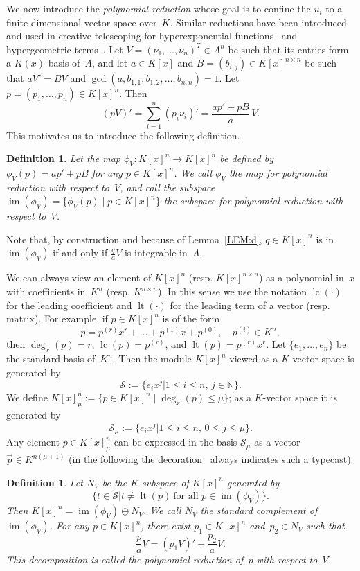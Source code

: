 \documentclass{sig-alternate}
\newtheorem{defi}[theorem]{Definition}
\newcommand{\bN}{ {\mathbb N}}
\newcommand{\cS}{ {\mathcal S}}
\def\lc{\operatorname{lc}}
\def\lt{\operatorname{lt}}
\def\im{\operatorname{im}}
\begin{document}
We now introduce the \emph{polynomial reduction} whose goal is to confine the $u_i$ to a finite-dimensional
vector space over~$K$. Similar reductions have been introduced and used in creative telescoping
for hyperexponential functions~\cite{bostan13a} and hypergeometric terms~\cite{chen15a}.
Let $V = (\nu_1, \ldots, \nu_n)^T\in A^n$ be such that its entries form a $K(x)$-basis of~$A$,
and let $a\in K[x]$ and $B = (b_{i, j})\in K[x]^{n \times n}$ be such that $aV'=BV$ and
$\gcd(a, b_{1, 1}, b_{1, 2}, \ldots, b_{n ,n})=1$. Let $p = (p_1, \ldots, p_n)\in K[x]^n$. Then
\begin{equation} \label{EQ:polyred}
  (pV)' = \sum_{i=1}^n (p_i \nu_i)' = \frac{ap' + pB}{a}\, V.
\end{equation}
This motivates us to introduce the following definition.
\begin{defi}
Let the map $\phi_V\colon K[x]^n \rightarrow K[x]^n$
be defined by $\phi_V(p) = ap' + pB$ for any $p\in K[x]^n$.
We call $\phi_V$ the \emph{map for polynomial reduction} with respect to~$V$, and call
the subspace $\im(\phi_V) = \{\phi_V(p) \mid p \in K[x]^n\}$
the \emph{subspace for polynomial reduction} with respect to~$V$.
\end{defi}
Note that, by construction and because of Lemma~\ref{LEM:d}, $q\in K[x]^n$ is in
$\im(\phi_V)$ if and only if $\frac{q}{a}V$ is integrable in~$A$.

We can always view an element of $K[x]^n$ (resp. $K[x]^{n\times n}$) as a polynomial in~$x$
with coefficients in~$K^n$ (resp. $K^{n\times n}$). In this sense we use the notation $\lc(\cdot)$
for the leading coefficient and $\lt(\cdot)$ for the leading term of a vector (resp. matrix).
For example, if $p\in K[x]^n$ is of the form
\[
  p = p^{(r)}x^r + \dots + p^{(1)}x + p^{(0)},\quad p^{(i)}\in K^n,
\]
then $\deg_x(p)=r$, $\lc(p)=p^{(r)}$, and $\lt(p)=p^{(r)}x^r$.
Let $\{e_1, \ldots, e_n\}$ be the standard basis of~$K^n$.
Then the module $K[x]^n$ viewed as a $K$-vector space is generated by
\[
  \cS := \bigl\{e_ix^j \mathrel{\big|} 1\leq i \leq n,\, j\in \bN\bigr\}.
\]
We define $K[x]_\mu^n:=\{p\in K[x]^n \mid \deg_x(p) \leq\mu\}$; as a $K$-vector
space it is generated by
\[
  \cS_\mu := \bigl\{e_ix^j \mathrel{\big|} 1\leq i \leq n,\, 0\leq j\leq \mu\bigr\}.
\]
Any element $p\in K[x]_\mu^n$ can be expressed in the
basis $\cS_\mu$ as a vector $\vec{p}\in K^{n(\mu+1)}$ (in the following the
decoration~\raisebox{-1pt}{$\vec{}\;$} always indicates such a typecast).

\begin{defi}
Let $N_V$ be the $K$-subspace of $K[x]^n$ generated by
\[
  \bigl\{t \in \cS \mathrel{\big|} t \neq \lt(p) \ \text{for all $p\in \im(\phi_V)$}\bigr\}.
\]
Then $K[x]^n = \im(\phi_V) \oplus N_V$.
We call $N_V$ the \emph{standard complement} of $\im(\phi_V)$.
For any $p\in K[x]^n$, there exist $p_1\in K[x]^n$ and~$p_2\in N_V$ such that
\[\frac{p}{a}V = (p_1V)' + \frac{p_2}{a}V.\]
This decomposition is called the \emph{polynomial reduction} of~$p$
with respect to~$V$.
\end{defi}
\end{document}
